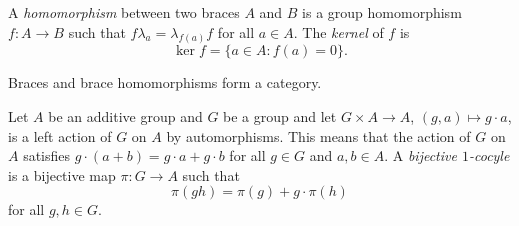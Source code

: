  \begin{definition}
 	A \emph{homomorphism} between two braces $A$ and $B$ is a group
 	homomorphism $f\colon A\to B$ such that $f\lambda_a=\lambda_{f(a)}f$ for
 	all $a\in A$.  The \emph{kernel} of $f$ is
     \[
         \ker f=\{a\in A:f(a)=0\}.
     \]
 \end{definition}

Braces and brace homomorphisms form a category.  

%
%


Let $A$ be an additive group and $G$ be a group and let 
$G\times A\to A$, $(g,a)\mapsto g\cdot a$,
is a left action of $G$ on $A$ by automorphisms. This means that the action of $G$ on $A$ satisfies 
$g\cdot (a+b)=g\cdot a+g\cdot b$ for all $g\in G$ and $a,b\in A$.
A \emph{bijective
$1$-cocyle} is a bijective map $\pi\colon G\to A$ such that 
\begin{equation}
    \label{eq:1cocycle}
    \pi(gh)=\pi(g)+g\cdot \pi(h)
\end{equation}
for all $g,h\in G$. 

